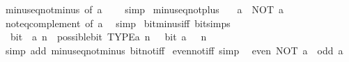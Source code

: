 \begin{isabellebody}
\ minus{\isacharunderscore}{\kern0pt}eq{\isacharunderscore}{\kern0pt}not{\isacharunderscore}{\kern0pt}minus{\isacharunderscore}{\kern0pt}{}\ {\isacharbrackleft}{\kern0pt}of\ {\isacartoucheopen}a\ {\isacharplus}{\kern0pt}\ {}{\isacartoucheclose}{\isacharbrackright}{\kern0pt}\ \isamarkupfalse%
\ simp%
\endisatagproof
{\isafoldproof}%
%
\isadelimproof
\isanewline
%
\endisadelimproof
\isanewline
{}\isamarkupfalse%
\ minus{\isacharunderscore}{\kern0pt}eq{\isacharunderscore}{\kern0pt}not{\isacharunderscore}{\kern0pt}plus{\isacharunderscore}{\kern0pt}{}{\isacharcolon}{\kern0pt}\isanewline
\ \ {\isacartoucheopen}{\isacharminus}{\kern0pt}\ a\ {\isacharequal}{\kern0pt}\ NOT\ a\ {\isacharplus}{\kern0pt}\ {}{\isacartoucheclose}\isanewline
%
\isadelimproof
\ \ %
\endisadelimproof
%
\isatagproof
{}\isamarkupfalse%
\ not{\isacharunderscore}{\kern0pt}eq{\isacharunderscore}{\kern0pt}complement\ {\isacharbrackleft}{\kern0pt}of\ a{\isacharbrackright}{\kern0pt}\ \isamarkupfalse%
\ simp%
\endisatagproof
{\isafoldproof}%
%
\isadelimproof
\isanewline
%
\endisadelimproof
\isanewline
{}\isamarkupfalse%
\ bit{\isacharunderscore}{\kern0pt}minus{\isacharunderscore}{\kern0pt}iff\ {\isacharbrackleft}{\kern0pt}bit{\isacharunderscore}{\kern0pt}simps{\isacharbrackright}{\kern0pt}{\isacharcolon}{\kern0pt}\isanewline
\ \ {\isacartoucheopen}bit\ {\isacharparenleft}{\kern0pt}{\isacharminus}{\kern0pt}\ a{\isacharparenright}{\kern0pt}\ n\ {\isasymlongleftrightarrow}\ possible{\isacharunderscore}{\kern0pt}bit\ TYPE{\isacharparenleft}{\kern0pt}{\isacharprime}{\kern0pt}a{\isacharparenright}{\kern0pt}\ n\ {\isasymand}\ {\isasymnot}\ bit\ {\isacharparenleft}{\kern0pt}a\ {\isacharminus}{\kern0pt}\ {}{\isacharparenright}{\kern0pt}\ n{\isacartoucheclose}\isanewline
%
\isadelimproof
\ \ %
\endisadelimproof
%
\isatagproof
{}\isamarkupfalse%
\ {\isacharparenleft}{\kern0pt}simp\ add{\isacharcolon}{\kern0pt}\ minus{\isacharunderscore}{\kern0pt}eq{\isacharunderscore}{\kern0pt}not{\isacharunderscore}{\kern0pt}minus{\isacharunderscore}{\kern0pt}{}\ bit{\isacharunderscore}{\kern0pt}not{\isacharunderscore}{\kern0pt}iff{\isacharparenright}{\kern0pt}%
\endisatagproof
{\isafoldproof}%
%
\isadelimproof
\isanewline
%
\endisadelimproof
\isanewline
{}\isamarkupfalse%
\ even{\isacharunderscore}{\kern0pt}not{\isacharunderscore}{\kern0pt}iff\ {\isacharbrackleft}{\kern0pt}simp{\isacharbrackright}{\kern0pt}{\isacharcolon}{\kern0pt}\isanewline
\ \ {\isacartoucheopen}even\ {\isacharparenleft}{\kern0pt}NOT\ a{\isacharparenright}{\kern0pt}\ {\isasymlongleftrightarrow}\ odd\ a{\isacartoucheclose}\ \isanewline

\end{isabellebody}
